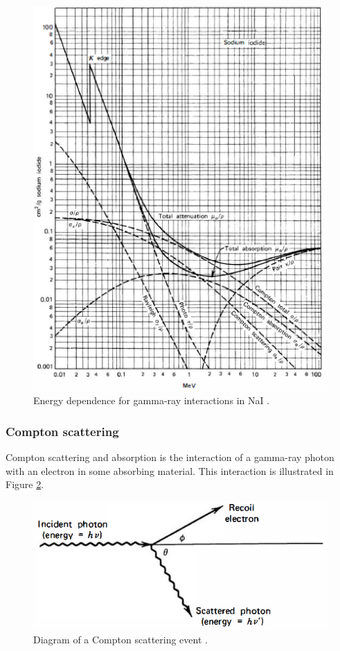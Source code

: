 \begin{figure}[H]
\centering
\includegraphics[width=0.75\linewidth]{images/energy_dependence_interactions}
\caption{Energy dependence for gamma-ray interactions in NaI \cite{knoll}.}
\label{fig:energy_dependence_interactions}
\end{figure}

\subsubsection{Compton scattering}

Compton scattering and absorption is the interaction of a gamma-ray photon with an electron in some absorbing material. This interaction is illustrated in Figure \ref{fig:compton_scatter}. 



\begin{figure}[H]
\centering
\includegraphics[width=0.8\linewidth]{images/compton_scatter}
\caption{Diagram of a Compton scattering event \cite{knoll}.}
\label{fig:compton_scatter}
\end{figure}

